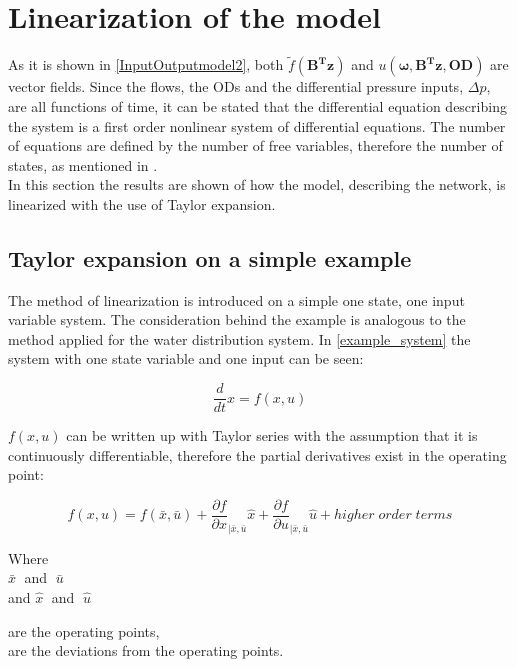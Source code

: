 \section{Linearization of the model} 
\label{Linearization}

As it is shown in \eqref{InputOutputmodel2}, both $\tilde f(\bm{B^T}\bm{z})$ and $u(\bm{\omega},\bm{B^T}\bm{z},\bm{OD})$ are vector fields. Since the flows, the ODs and the differential pressure inputs, $\Delta p$, are all functions of time, it can be stated that the differential equation describing the system is a first order nonlinear system of differential equations. The number of equations are defined by the number of free variables, therefore the number of states, as mentioned in .
\\
In this section the results are shown of how the model, describing the network, is linearized with the use of Taylor expansion.

\subsection{Taylor expansion on a simple example}
 \label{Taylorexamplesection}

The method of linearization is introduced on a simple one state, one input variable system. The consideration behind the example is analogous to the method applied for the water distribution system. In \eqref{example_system} the system with one state variable and one input can be seen: 

\begin{equation}
\frac{d}{dt} x = f(x,u)
 \label{example_system}
\end{equation}

$f(x,u)$ can be written up with Taylor series with the assumption that it is continuously differentiable, therefore the partial derivatives exist in the operating point: 

\begin{equation}
f(x,u) = f(\bar{x},\bar{u}) + \frac{\partial f}{\partial x}_{|\bar{x}, \bar{u}} \hat{x} + \frac{\partial f}{\partial u}_{|\bar{x}, \bar{u}} \hat{u} + higher \; order \; terms  
 \label{TaylorExpansion}
\end{equation}

\begin{minipage}[t]{0.20\textwidth}
Where\\
\hspace*{8mm} $\bar{x} \;$ and $\; \bar{u}$ \\
and \hspace*{0.7mm} $\hat{x} \;$ and $\; \hat{u}$ 
\end{minipage}
\begin{minipage}[t]{0.68\textwidth}
\vspace*{2mm}
are the operating points,\\
are the deviations from the operating points.
\end{minipage}


